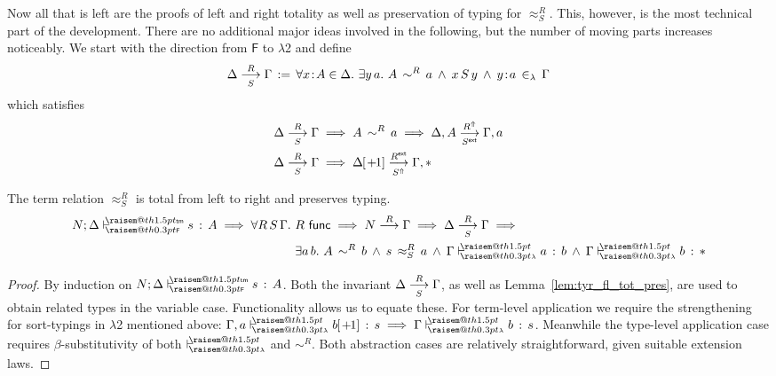 \documentclass[a4paper,UKenglish]{lipics-v2016}
\makeatletter
\newcommand{\ms}{\,}
\newcommand{\mrel}[1]{\mathrel{\ms #1 \ms}}
\newcommand{\OF}{\mrel{:}}
\newcommand{\mAnd}{\mrel{\wedge}}
\newcommand{\mAll}[1]{\ensuremath{\forall} #1.\ms\ms}
\newcommand{\mEx}[1]{\ensuremath{\exists} #1.\ms\ms}
\newcommand{\eqdef}{\mrel{:=}}
\newcommand{\SysF}{\ensuremath{\mathsf{F}}\xspace}
\newcommand{\SysL}{$\lambda$2\xspace}
\newcommand{\tm}{\mathsf{tm}}
\newcommand{\of}{\ensuremath{\!:\!}}
\newcommand{\cc}[2]{#1;#2} %
\newcommand{\raisemath}[1]{\mathpalette{\raisem@th{#1}}}
\newcommand{\raisem@th}[3]{\raisebox{#1}{\ensuremath{#2#3}}}
\newcommand{\tsAnnot}[2]{\vdash\hspace{-.7em}^{\raisemath{1.5pt}{\scriptscriptstyle{#2}}}_{\raisemath{0.3pt}{\scriptscriptstyle{#1}}}} %
\newcommand{\tyF}{\tsAnnot{\SysF}{\tm}}  %
\newcommand{\typingF}[3]{\ensuremath{{#1} \mathrel{\tyF} #2 \OF #3}}
\newcommand{\tyL}{\tsAnnot{\lambda}{}} %
\newcommand{\typingL}[3]{\ensuremath{{#1} \mathrel{\tyL} #2 \OF #3}}
\newcommand{\inL}{\mrel{\in_{\lambda}}}
\newcommand{\tyr}{\mathrel{\sim}}
\newcommand{\tmr}{\mathrel{\approx}}
\newcommand{\Rext}[1]{\ensuremath{#1^{\mathsf{ext}}}}
\newcommand{\Rshift}[1]{\ensuremath{#1^{\Uparrow}}}
\newcommand{\tyctxrelFL}[3]{\ensuremath{#1\mathrel{\mathop{\longrightarrow}^{#2}\limits}#3}}
\newcommand{\tmctxrelFL}[4]{\ensuremath{#1\mathrel{\mathop{\longrightarrow}^{#2}_{#3}\limits}#4}}
\newcommand{\Prp}{\ensuremath{\textrm{\textasteriskcentered}}}
\newcommand{\subst}[1]{\hphantom{|}\!\![{#1}]}
\newcommand{\shift}{\ensuremath{\hspace{0.1em}\mathsf{+}\hspace{0.08em}\!1}}
\makeatother
\begin{document}
Now all that is left are the proofs of left and right totality as well as preservation of typing for $\tmr^R_S$.
This, however, is the most technical part of the development.
There are no additional major ideas involved in the following, but the number of moving parts increases noticeably.
We start with the direction from \SysF to \SysL and define
\begin{align*}
  \tmctxrelFL{\Delta}{R}{S}{\Gamma} \eqdef \mAll {x \of A \in \Delta} \mEx{y\,a} A\,\tyr^R\,a \mAnd x\,S\,y \mAnd y \of a \inL \Gamma
\end{align*}
which satisfies
\begin{align*}
  &\tmctxrelFL{\Delta}{R}{S}{\Gamma} \implies A\,\tyr^R\,a \implies \tmctxrelFL{\Delta,A}{\Rshift{R}}{\Rext{S}}{\Gamma,a}\\
  &\tmctxrelFL{\Delta}{R}{S}{\Gamma} \implies \tmctxrelFL{\Delta\subst{\shift}}{\Rext{R}}{\Rshift{S}}{\Gamma,\Prp}
\end{align*}
\begin{lemma}
  The term relation $\tmr^R_S$ is total from left to right and preserves typing.
  \begin{align*}
    \typingF{\cc{N}{\Delta}}{s}{A} \implies \mAll{R\,S\,\Gamma} &R\ms\ms\mathsf{func} \implies \tyctxrelFL{N}{R}{\Gamma} \implies \tmctxrelFL{\Delta}{R}{S}{\Gamma} \implies \\
                                                                &\mEx{a\,b} A\,\tyr^R\,b \mAnd s\,\tmr^R_S\,a \mAnd \typingL{\Gamma}{a}{b} \mAnd \typingL{\Gamma}{b}{\Prp}
  \end{align*}
\end{lemma}
\begin{proof}
  By induction on $\typingF{\cc{N}{\Delta}}{s}{A}$.
  Both the invariant $\tmctxrelFL{\Delta}{R}{S}{\Gamma}$, as well as Lemma~\ref{lem:tyr_fl_tot_pres}, are used to obtain related types in the variable case.
  Functionality allows us to equate these.
  For term-level application we require the strengthening for sort-typings in \SysL mentioned above: $\typingL{\Gamma,a}{b\subst{\shift}}{s} \implies \typingL{\Gamma}{b}{s}$.
  Meanwhile the type-level application case requires $\beta$-substitutivity of both $\tyL$ and $\tyr^R$.
  Both abstraction cases are relatively straightforward, given suitable extension laws.
\end{proof}
\end{document}
